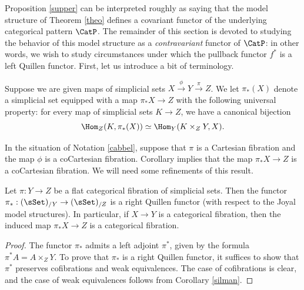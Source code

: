 Proposition \ref{supper} can be interpreted roughly as saying that the model structure
of Theorem \ref{theo} defines a covariant functor of the underlying categorical
pattern $\CatP$. The remainder of this section is devoted to studying the behavior of
this model structure as a {\em contravariant} functor of $\CatP$: in other words, we wish to study circumstances under which the pullback functor $f^{\ast}$ is a left Quillen functor.
First, let us introduce a bit of terminology.

\begin{notation}\label{cabbel}
Suppose we are given maps of simplicial sets $X \stackrel{\phi}{\rightarrow} Y \stackrel{\pi}{\rightarrow} Z$.
We let $\pi_{\ast}(X)$ denote a simplicial set equipped with a map $\pi_{\ast} X \rightarrow Z$
with the following universal property: for every map of simplicial sets $K \rightarrow Z$, we
have a canonical bijection
$$ \Hom_{ Z}( K, \pi_{\ast}(X) ) \simeq \Hom_{Y}( K \times_{Z} Y, X).$$
\end{notation}

In the situation of Notation \ref{cabbel}, suppose that $\pi$ is a Cartesian fibration and the map
$\phi$ is a coCartesian fibration. Corollary  implies that the
map $\pi_{\ast} X \rightarrow Z$ is a coCartesian fibration. We will need some refinements of this result.

\begin{proposition}\label{saeve}
Let $\pi: Y \rightarrow Z$ be a flat categorical fibration of simplicial sets.
Then the functor $\pi_{\ast}: ( \sSet)_{/Y} \rightarrow (\sSet)_{/Z}$ is a right
Quillen functor (with respect to the Joyal model structures). In particular,
if $X \rightarrow Y$ is a categorical fibration, then the induced map
$\pi_{\ast} X \rightarrow Z$ is a categorical fibration.
\end{proposition}

\begin{proof}
The functor $\pi_{\ast}$ admits a left adjoint $\pi^{\ast}$, given by the formula
$\pi^{\ast} A = A \times_{Z} Y$. To prove that $\pi_{\ast}$ is a right Quillen functor, it suffices to show that $\pi^{\ast}$ preserves cofibrations and weak equivalences. The case of cofibrations is clear, and
the case of weak equivalences follows from Corollary \ref{silman}.
\end{proof}

